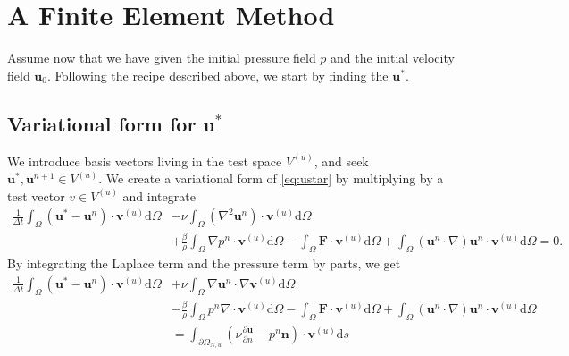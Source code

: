 \documentclass[a4paper,10pt]{article}
\renewcommand{\vec}[1]{\mathbf{#1}}
\renewcommand{\(}{\left(}
\renewcommand{\)}{\right)}
\newcommand{\dm}[1]{\text{d}#1}
\newcommand{\dpart}[2]{\frac{\partial#1}{\partial#2}}
\begin{document}
\section{A Finite Element Method}
Assume now that we have given the initial pressure field $p$ and the initial velocity field $\vec u_0$. Following the recipe described above, we start by finding the $\vec u^*$. 
\subsection{Variational form for $\vec u^*$}
We introduce basis vectors living in the test space $V^{(u)}$, and seek $\vec u^*, \vec u^{n+1} \in V^{(u)}$. We create a variational form of \eqref{eq:ustar} by multiplying by a test vector $v\in V^{(u)}$ and integrate
\begin{align*}
  \frac{1}{\Delta t}\int_\Omega(\vec u^* - \vec u^{n})\cdot\vec v^{(u)}\dm \Omega
  &- \nu\int_\Omega (\nabla^2\vec u^n)\cdot\vec v^{(u)} \dm \Omega\\
   &+ \frac{\beta}{\rho}\int_\Omega\nabla p^n \cdot\vec v^{(u)} \dm \Omega 
   - \int_\Omega\vec F\cdot\vec v^{(u)} \dm \Omega 
   + \int_\Omega(\vec u^n\cdot \nabla)\vec u^n\cdot\vec v^{(u)} \dm \Omega = 0.
\end{align*}
By integrating the Laplace term and the pressure term by parts, we get
\begin{align*}
  \frac{1}{\Delta t}\int_\Omega(\vec u^* - \vec u^{n})\cdot\vec v^{(u)}\dm \Omega
  &+ \nu\int_\Omega\nabla\vec u^n\cdot\nabla\vec v^{(u)} \dm \Omega\\
   &- \frac{\beta}{\rho}\int_\Omega p^n \nabla\cdot\vec v^{(u)} \dm \Omega 
   - \int_\Omega\vec F\cdot\vec v^{(u)} \dm \Omega 
   + \int_\Omega (\vec u^n\cdot \nabla)\vec u^n\cdot\vec v^{(u)} \dm \Omega\\
   &= \int_{\partial\Omega_{N,u}} (\nu\dpart{\vec u}{n} - p^n\vec n)\cdot\vec v^{(u)} \dm s
\end{align*}
\end{document}

